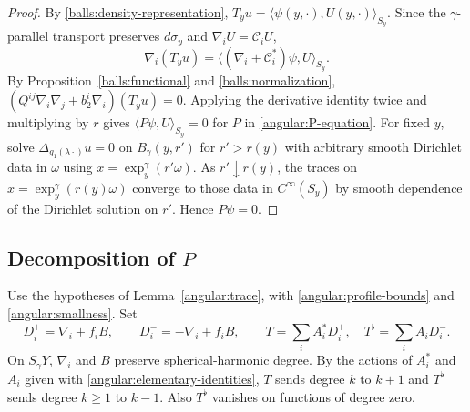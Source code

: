 \documentclass[11pt,a4paper]{article}
\theoremstyle{definition}
\theoremstyle{remark}
\numberwithin{equation}{section}
\begin{document}
\begin{proof}
By \eqref{balls:density-representation},
$T_yu=\langle\psi(y,\cdot),U(y,\cdot)\rangle_{S_y}$. Since the
$\gamma$-parallel transport preserves $d\sigma_y$ and
$\nabla_iU=\mathcal C_iU$,
\[
 \nabla_i(T_yu)
 =\langle(\nabla_i+\mathcal C_i^*)\psi,U\rangle_{S_y}.
\]
By Proposition~\ref{balls:functional} and \eqref{balls:normalization},
$(Q^{ij}\nabla_i\nabla_j+b_2^i\nabla_i)(T_yu)=0$.
Applying the derivative identity twice and multiplying by $r$
gives $\langle P\psi,U\rangle_{S_y}=0$ for $P$ in
\eqref{angular:P-equation}.
For fixed $y$, solve $\Delta_{g_1(\lambda\cdot)}u=0$ on $B_\gamma(y,r')$
for $r'>r(y)$ with arbitrary smooth Dirichlet data in $\omega$
using $x=\exp_y^\gamma(r'\omega)$. As $r'\downarrow r(y)$, the
traces on $x=\exp_y^\gamma(r(y)\omega)$ converge to those data in
$C^\infty(S_y)$ by smooth dependence of the Dirichlet solution on
$r'$. Hence $P\psi=0$.
\end{proof}

\subsection{Decomposition of \texorpdfstring{$P$}{P}}

Use the hypotheses of Lemma~\ref{angular:trace}, with
\eqref{angular:profile-bounds} and \eqref{angular:smallness}. Set
\begin{equation}\label{angular:T-definition}
 D_i^+=\nabla_i+f_iB,\qquad D_i^-=-\nabla_i+f_iB,
 \qquad
 T=\sum_i A_i^*D_i^+,\quad T^\flat=\sum_i A_iD_i^-.
\end{equation}
On $S_\gamma Y$, $\nabla_i$ and $B$ preserve spherical-harmonic
degree. By the actions of $A_i^*$ and $A_i$ given with
\eqref{angular:elementary-identities}, $T$ sends degree $k$ to $k+1$
and $T^\flat$ sends degree $k\ge1$ to $k-1$. Also $T^\flat$ vanishes
on functions of degree zero.
\end{document}
